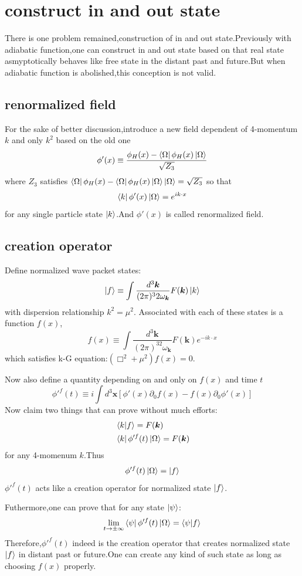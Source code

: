 \documentclass[a4paper]{article}
\begin{document}
\section{construct in and out state}
There is one problem remained,construction of in and out state.Previously with adiabatic function,one can construct in and out state based on that real state asmyptotically behaves like free state in the distant past and future.But when adiabatic function is abolished,this conception is not valid.
\subsection{renormalized field}
For the sake of better discussion,introduce a new field dependent of 4-momentum $k$ and only $k^2$ based on the old one
$$\phi'(x)\equiv\frac{\phi_H(x)-\bra{\Omega}\phi_H(x)\ket{\Omega}}{\sqrt{Z_3}}$$where $Z_3$ satisfies $\bra{\Omega}\phi_H(x)-\bra{\Omega}\phi_H(x)\ket{\Omega}\ket{\Omega}=\sqrt{Z_3}$ so that$$\bra{k}\phi'(x)\ket{\Omega}=e^{ik\cdot x}$$for any single particle state $\ket{k}$.And $\phi'(x)$ is called renormalized field.
\subsection{creation operator}
Define normalized wave packet states:$$\ket{f}\equiv\int\frac{d^3\bm{k}}{(2\pi)^32\omega_{\bm{k}}}F(\bm{k})\ket{k}$$with dispersion relationship $k^2=\mu^2$.
Associated with each of these states is a function $f(x)$,$$f(x)\equiv\int\frac{d^3\bm{k}}{(2\pi)^32\omega_{\bm{k}}}F(\bm{k})e^{-ik\cdot x}$$which satisfies k-G equation:$(\Box^2+\mu^2)f(x)=0$.
\par Now also define a quantity depending on and only on $f(x)$ and time $t$
$$\phi'^{f}(t)\equiv i\int d^3\bm{x}[\phi'(x)\partial_0f(x)-f(x)\partial_0\phi'(x)]$$
Now claim two things that can prove without much efforts:
\begin{align*}
	&\braket{k|f}=F(\bm{k})\\
	&\bra{k}\phi'^f(t)\ket{\Omega}=F(\bm{k})
\end{align*}
for any 4-momenum $k$.Thus$$\phi'^f(t)\ket{\Omega}=\ket{f}$$ $\phi'^f(t)$ acts like a creation operator for normalized state $\ket{f}$.
\par Futhermore,one can prove that for any state $\ket{\psi}$:$$\lim_{t\rightarrow\pm\infty}\bra{\psi}\phi'^f(t)\ket{\Omega}=\braket{\psi|f}$$Therefore,$\phi'^f(t)$ indeed is the creation operator that creates normalized state $\ket{f}$ in distant past or future.One can create any kind of such state as long as choosing $f(x)$ properly. 
\end{document}
